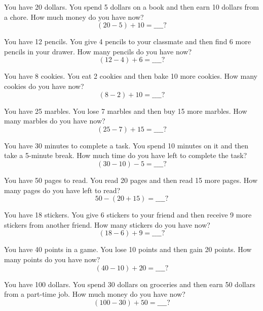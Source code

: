You have 20 dollars. You spend 5 dollars on a book and then earn 10 dollars from a chore. How much money do you have now?
\begin{equation*}
(20 - 5) + 10 = \_\_\_\_?
\end{equation*}

You have 12 pencils. You give 4 pencils to your classmate and then find 6 more pencils in your drawer. How many pencils do you have now?
\begin{equation*}
(12 - 4) + 6 = \_\_\_\_?
\end{equation*}

You have 8 cookies. You eat 2 cookies and then bake 10 more cookies. How many cookies do you have now?
\begin{equation*}
(8 - 2) + 10 = \_\_\_\_?
\end{equation*}

You have 25 marbles. You lose 7 marbles and then buy 15 more marbles. How many marbles do you have now?
\begin{equation*}
(25 - 7) + 15 = \_\_\_\_?
\end{equation*}

You have 30 minutes to complete a task. You spend 10 minutes on it and then take a 5-minute break. How much time do you have left to complete the task?
\begin{equation*}
(30 - 10) - 5 = \_\_\_\_?
\end{equation*}

You have 50 pages to read. You read 20 pages and then read 15 more pages. How many pages do you have left to read?
\begin{equation*}
50 - (20 + 15) = \_\_\_\_?
\end{equation*}

You have 18 stickers. You give 6 stickers to your friend and then receive 9 more stickers from another friend. How many stickers do you have now?
\begin{equation*}
(18 - 6) + 9 = \_\_\_\_?
\end{equation*}

You have 40 points in a game. You lose 10 points and then gain 20 points. How many points do you have now?
\begin{equation*}
(40 - 10) + 20 = \_\_\_\_?
\end{equation*}

You have 100 dollars. You spend 30 dollars on groceries and then earn 50 dollars from a part-time job. How much money do you have now?
\begin{equation*}
(100 - 30) + 50 = \_\_\_\_?
\end{equation*}

